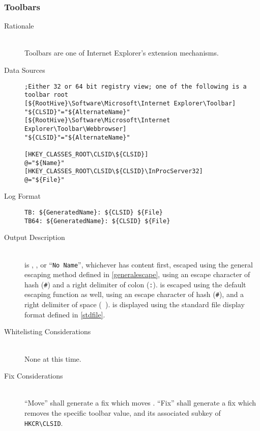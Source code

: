 \subsubsection{Toolbars}
\begin{description}
\item[Rationale] \hfill \\
Toolbars are one of Internet Explorer's extension mechanisms.
\item[Data Sources] \hfill
\vspace{-\baselineskip}
\begin{verbatim}
;Either 32 or 64 bit registry view; one of the following is a toolbar root
[${RootHive}\Software\Microsoft\Internet Explorer\Toolbar]
"${CLSID}"="${AlternateName}"
[${RootHive}\Software\Microsoft\Internet Explorer\Toolbar\Webbrowser]
"${CLSID}"="${AlternateName}"

[HKEY_CLASSES_ROOT\CLSID\${CLSID}]
@="${Name}"
[HKEY_CLASSES_ROOT\CLSID\${CLSID}\InProcServer32]
@="${File}"
\end{verbatim}
\item[Log Format] \hfill
\vspace{-\baselineskip}
\begin{verbatim}
TB: ${GeneratedName}: ${CLSID} ${File}
TB64: ${GeneratedName}: ${CLSID} ${File}
\end{verbatim}
\item[Output Description] \hfill \\
 is , , or ``\verb|No Name|'',
whichever has content first, escaped using the general escaping method defined
in \ref{generalescape}, using an escape character of hash (\verb|#|) and a right
delimiter of colon (\verb|:|).  is escaped using the default escaping
function as well, using an escape character of hash (\verb|#|), and a right
delimiter of space (\verb| |).  is displayed using the standard file
display format defined in \ref{stdfile}.
\item[Whitelisting Considerations] \hfill \\
None at this time.
\item[Fix Considerations] \hfill \\
``Move'' shall generate a fix which moves . ``Fix'' shall generate a
fix which removes the specific toolbar value, and its associated subkey of
\verb|HKCR\CLSID|.
\end{description}

